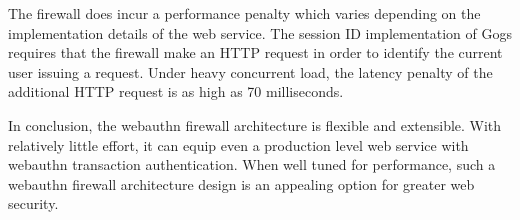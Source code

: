 The firewall does incur a performance penalty which varies depending on the implementation details of the web service. The session ID implementation of Gogs requires that the firewall make an HTTP request in order to identify the current user issuing a request. Under heavy concurrent load, the latency penalty of the additional HTTP request is as high as 70 milliseconds.

In conclusion, the webauthn firewall architecture is flexible and extensible. With relatively little effort, it can equip even a production level web service with webauthn transaction authentication. When well tuned for performance, such a webauthn firewall architecture design is an appealing option for greater web security.




